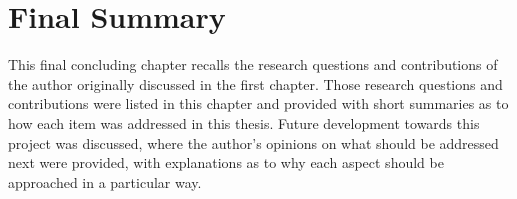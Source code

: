 \section{Final Summary}
This final concluding chapter recalls the research questions and contributions of the author originally discussed in the first chapter.
Those research questions and contributions were listed in this chapter and provided with short summaries as to how each item was addressed in this thesis.
Future development towards this project was discussed, where the author's opinions on what should be addressed next were provided, with explanations as to why each aspect should be approached in a particular way.
